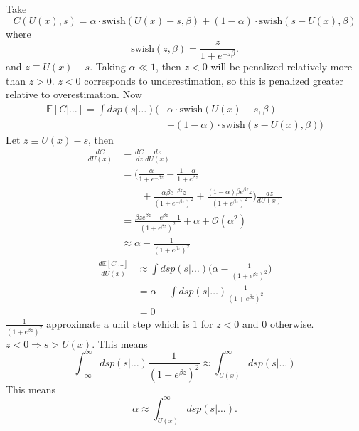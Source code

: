 \begin{example}
	Take
	\begin{equation}
		C(U(x), s) = \alpha\cdot \text{swish}(U(x)-s,\beta)+(1-\alpha)\cdot\text{swish}(s-U(x),\beta)
	\end{equation}
	where
	\begin{equation}
		\text{swish}(z,\beta) = \frac{z}{1+e^{-z\beta}}.
	\end{equation}
	and $z\equiv U(x)-s$. Taking $\alpha \ll 1$, then $z<0$ will be penalized relatively more than $z>0$. $z<0$ corresponds to underestimation, so this is penalized greater relative to overestimation. Now
	\begin{equation}
		\begin{split}
			\mathbb{E}[C|\dots ] =\int ds p(s|\dots) \bigg(&\alpha\cdot \text{swish}(U(x)-s,\beta)\\
			&+(1-\alpha)\cdot\text{swish}(s-U(x),\beta)\bigg)
		\end{split}
	\end{equation}
	Let $z\equiv U(x)-s$, then
	\begin{equation}
		\begin{split}
			\frac{dC}{dU(x)} & = \frac{dC}{dz}\frac{dz}{dU(x)}\\
			& = \bigg(\frac{\alpha}{1+e^{-\beta z}}-\frac{1-\alpha}{1+e^{\beta z}}\\
			&\qquad+\frac{\alpha\beta e^{-\beta z}z}{(1+e^{-\beta z})^2}+\frac{(1-\alpha)\beta e^{\beta z}z}{(1+e^{\beta z})^2}\bigg)\frac{dz}{dU(x)}\\
			&= \frac{\beta z e^{\beta z}-e^{\beta z}-1}{(1+e^{\beta z})^2}+\alpha+\mathcal{O}(\alpha^2)\\
			&\approx  \alpha -\frac{1}{(1+e^{\beta z})^2}
		\end{split}
	\end{equation}
	\begin{equation}
		\begin{split}
			\frac{d\mathbb{E}[C|\dots ]}{dU(x)} &\approx \int ds p(s|\dots) \bigg(\alpha -\frac{1}{(1+e^{\beta z})^2}\bigg)\\
			& = \alpha -\int ds p(s|\dots)\frac{1}{(1+e^{\beta z})^2}\\
			& = 0
		\end{split}
	\end{equation}
	$\frac{1}{(1+e^{\beta z})^2}$ approximate a unit step which is $1$ for $z<0$ and $0$ otherwise. $z<0 \Rightarrow s>U(x)$. This means
	\begin{equation}
		\int_{-\infty}^{\infty} ds p(s|\dots)\frac{1}{(1+e^{\beta z})^2} \approx \int_{U(x)}^{\infty} ds p(s|\dots)
	\end{equation}
	This means
	\begin{equation}
		\alpha \approx \int_{U(x)}^{\infty} ds p(s|\dots).
	\end{equation}
\end{example}


